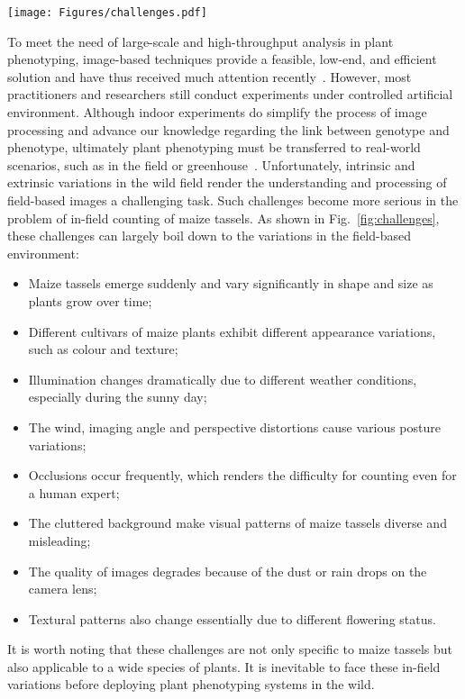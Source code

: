 \documentclass[twocolumn]{bmcart}%
\begin{document}
\begin{figure*}[h!]
	\centering
	\texttt{[image: Figures/challenges.pdf]}
	\caption{Intrinsic and extrinsic variations in the maize field. These variations pose significant challenges for in-field counting of maize tassels.}
	\label{fig:challenges}
\end{figure*}

To meet the need of large-scale and high-throughput analysis in plant phenotyping, image-based techniques provide a feasible, low-end, and efficient solution and have thus received much attention recently~\cite{guo2015automated,lu2015fine,yang2014combining,gage2017tips}. However, most practitioners and researchers still conduct experiments under controlled artificial environment. Although indoor experiments do simplify the process of image processing and advance our knowledge regarding the link between genotype and phenotype, ultimately plant phenotyping must be transferred to real-world scenarios, such as in the field or greenhouse~\cite{fiorani2013future}. Unfortunately, intrinsic and extrinsic variations in the wild field render the understanding and processing of field-based images a challenging task. Such challenges become more serious in the problem of in-field counting of maize tassels. As shown in Fig.~\ref{fig:challenges}, these challenges can largely boil down to the variations in the field-based environment:
\begin{itemize}
	\item Maize tassels emerge suddenly and vary significantly in shape and size as plants grow over time;
	\item Different cultivars of maize plants exhibit different appearance variations, such as colour and texture;
	\item Illumination changes dramatically due to different weather conditions, especially during the sunny day;
	\item The wind, imaging angle and perspective distortions cause various posture variations;
	\item Occlusions occur frequently, which renders the difficulty for counting even for a human expert;
	\item The cluttered background make visual patterns of maize tassels diverse and misleading;
	\item The quality of images degrades because of the dust or rain drops on the camera lens;
	\item Textural patterns also change essentially due to different flowering status.
\end{itemize}
It is worth noting that these challenges are not only specific to maize tassels but also applicable to a wide species of plants. It is inevitable to face these in-field variations before deploying plant phenotyping systems in the wild.
\end{document}
